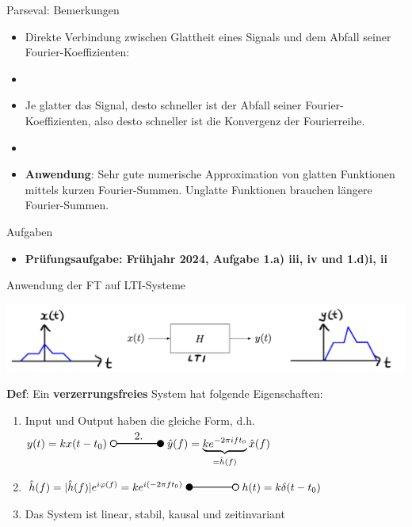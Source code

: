 \documentclass[14pt, aspectratio=169, handout]{beamer}
\newcommand{\transform}[2]{%
    \begin{tikzpicture}
        \draw[thick] (0,0) circle (0.1);
        \draw[thick] (0.1,0) -- (#2,0) node[midway, above] {#1};
        \filldraw[thick] (#2,0) circle (0.1);
    \end{tikzpicture}%
}
\newcommand{\invtransform}[2]{%
    \begin{tikzpicture}
        \filldraw[thick] (0,0) circle (0.1);
        \draw[thick] (0.1,0) -- (#2 -0.1,0) node[midway, above] {#1};
        \draw[thick] (#2,0) circle (0.1);
    \end{tikzpicture}%
}
\begin{document}
\begin{frame}{Parseval: Bemerkungen}
    \begin{itemize}
        \item Direkte Verbindung zwischen Glattheit eines Signals und dem Abfall seiner Fourier-Koeffizienten:
        \item[]
        \item Je glatter das Signal, desto schneller ist der Abfall seiner Fourier-Koeffizienten, also desto schneller ist die Konvergenz der Fourierreihe.
        \item[]
        \item \textbf{Anwendung}: Sehr gute numerische Approximation von glatten Funktionen mittels kurzen Fourier-Summen. Unglatte Funktionen brauchen längere Fourier-Summen.
    \end{itemize}
\end{frame}

\begin{frame}{Aufgaben}
    \begin{itemize}
        \item \textbf{Prüfungsaufgabe: Frühjahr 2024, Aufgabe 1.a) iii, iv und 1.d)i, ii}
    \end{itemize}
\end{frame}

\begin{frame}{Anwendung der FT auf LTI-Systeme}
\vspace*{-0.5cm}
   \begin{center}
    \includegraphics[width=0.7\linewidth]{figures/Verzerrungsfrei.jpg}
\end{center}
\vspace*{-0.5cm}
\textbf{Def}: Ein \textbf{verzerrungsfreies} System hat folgende Eigenschaften:
\vspace*{0.25cm}
\begin{enumerate}
    \item Input und Output haben die gleiche Form, d.h.\\
    $y(t) = kx(t-t_0) \; \transform{2.}{1.5} \; \hat{y}(f) = \underbrace{ke^{-2\pi i f t_0}}_{= \hat{h}(f)}\hat{x}(f)$
    \item $\hat{h}(f) = |\hat{h}(f)|e^{i \varphi(f)} = k e^{i(-2 \pi f t_0)} \; \invtransform{}{1.5} \; h(t) = k \delta(t-t_0)$
    \item Das System ist linear, stabil, kausal und zeitinvariant
\end{enumerate}
\end{frame}
\end{document}
